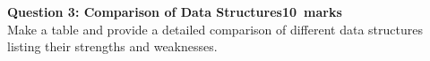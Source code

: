 \documentclass[12pt,a4paper]{article}
\def\Qthree{10}
\begin{document}
%
%
%		
\noindent\textbf{Question 3: Comparison of Data Structures\hfill \Qthree~marks}\\
Make a table and provide a detailed comparison of different data structures listing their strengths and weaknesses.
\newpage
\end{document}
